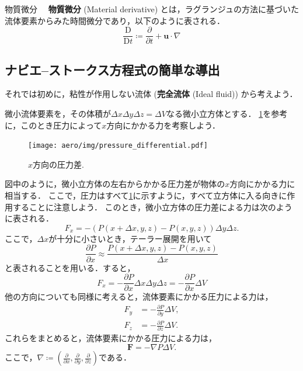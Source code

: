 \documentclass[uplatex,dvipdfmx,a4j,11pt]{jsreport}
\newcommand{\keyword}[1]{\textcolor{mainblue}{\textbf{#1}}}
\newcommand{\Diff}{\mathrm{D}} %
\numberwithin{equation}{chapter}
\begin{document}
\begin{definition}{物質微分}{}{}
  　\keyword{物質微分} (Material derivative) とは，ラグランジュの方法に基づいた流体要素からみた時間微分であり，以下のように表される．
    \begin{equation}
      \frac{\Diff}{\Diff t} \coloneqq \frac{\partial }{\partial t} + \mathbf{u}\cdot \nabla
    \end{equation}
\end{definition}

\subsection{ナビエ--ストークス方程式の簡単な導出}

それでは初めに，粘性が作用しない流体 (\keyword{完全流体} (Ideal fluid)) から考えよう．

微小流体要素を，その体積が$\Delta x \Delta y \Delta z = \Delta V$なる微小立方体とする．
\cref{fig:pressure_differential}を参考に，このとき圧力によって$x$方向にかかる力を考察しよう．

\begin{figure}[h]
  \centering
  \texttt{[image: aero/img/pressure\_differential.pdf]}
  \caption{$x$方向の圧力差.}
  \label{fig:pressure_differential}
\end{figure}

図中のように，微小立方体の左右からかかる圧力差が物体の$x$方向にかかる力に相当する．
ここで，圧力はすべて\cref{fig:pressure_differential}に示すように，すべて立方体に入る向きに作用することに注意しよう．
このとき，微小立方体の圧力差による力は次のように表される．
  \begin{equation}
    F_x = -\left(P(x + \Delta x, y, z) - P(x, y, z)\right) \Delta y \Delta z.
  \end{equation}
ここで，$\Delta x$が十分に小さいとき，テーラー展開を用いて
\begin{equation}
  \frac{\partial P}{\partial x} \approx \frac{P(x + \Delta x, y, z) - P(x, y, z)}{\Delta x}
\end{equation}
と表されることを用いる．すると，
\begin{equation}
  F_x = -\frac{\partial P}{\partial x} \Delta x\Delta y \Delta z = -\frac{\partial P}{\partial x} \Delta V
\end{equation}
他の方向についても同様に考えると，流体要素にかかる圧力による力は，
\begin{align*}
  F_y &= -\frac{\partial P}{\partial y} \Delta V, \\
  F_z &= -\frac{\partial P}{\partial z} \Delta V.
\end{align*}
これらをまとめると，流体要素にかかる圧力による力は，
\begin{equation}
  \mathbf{F} = -\nabla P \Delta V.
\end{equation}
ここで，$\nabla \coloneqq \left(\frac{\partial }{\partial x}, \frac{\partial }{\partial y}, \frac{\partial }{\partial z}\right)$である．
\end{document}
